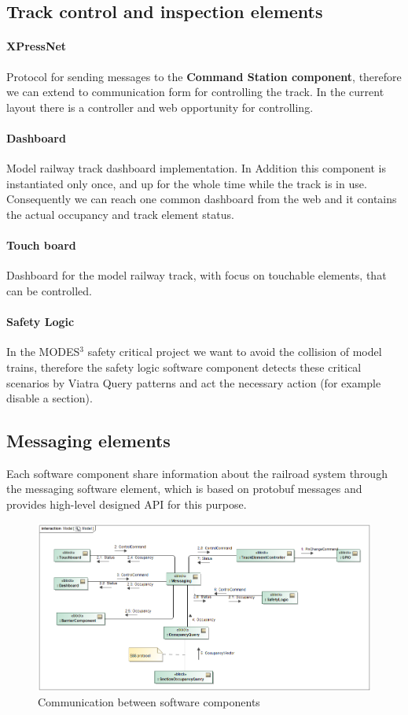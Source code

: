 \subsection{Track control and inspection elements}
\paragraph{XPressNet}
Protocol for sending messages to the \textbf{Command Station component}, therefore we can extend to communication form for controlling the track. In the current layout there is a controller and web opportunity for controlling.
\paragraph{Dashboard}
Model railway track dashboard implementation. In Addition this component is instantiated only once, and up for the whole time while the track is in use. Consequently we can reach one common dashboard from the web and it contains the actual occupancy and track element status.
\paragraph{Touch board}
Dashboard for the model railway track, with focus on touchable elements, that can be controlled.
\paragraph{Safety Logic}
In the MODES$^3$ safety critical project we want to avoid the collision of model trains, therefore the safety logic software component detects these critical scenarios by Viatra Query patterns and act the necessary action (for example disable a section).

\subsection{Messaging elements}
Each software component share information about the railroad system through the messaging software element, which is based on protobuf messages and provides high-level designed API for this purpose. 
\begin{figure}[!h]
	\centering
	\includegraphics[width=150mm, keepaspectratio]{figures/modes3/CommunicationModel.png}
	\caption{Communication between software components}
	\label{fig:communicationModel}
\end{figure}


